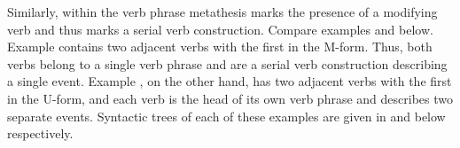 
Similarly, within the verb phrase metathesis marks the presence
of a modifying verb and thus marks a serial verb construction.
Compare examples  and  below.
Example  contains two adjacent verbs with the first in the M-form.
Thus, both verbs belong to a single verb phrase and
are a serial verb construction describing a single event.
Example , on the other hand,
has two adjacent verbs with the first in the U-form,
and each verb is the head of its own verb phrase
and describes two separate events.
Syntactic trees of each of these examples are
given in  and 
below respectively.

